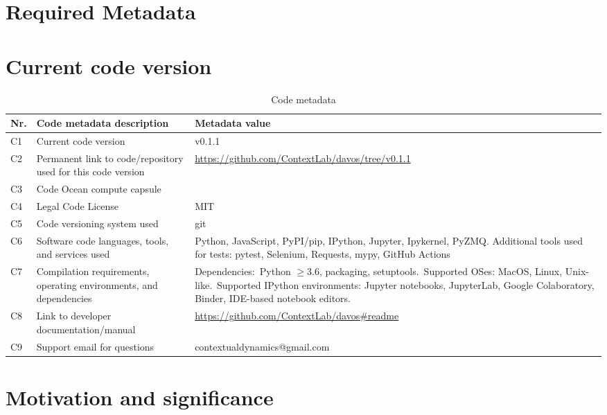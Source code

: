 \documentclass[preprint,12pt, a4paper]{elsarticle}
\begin{document}
\section*{Required Metadata}

\section*{Current code version}


\begin{table}[H]
\begin{tabular}{|l|p{6.5cm}|p{6.5cm}|}
\hline
\textbf{Nr.} & \textbf{Code metadata description} & \textbf{Metadata value} \\
\hline
C1 & Current code version &  v0.1.1 \\
\hline
C2 & Permanent link to code/repository used for this code version & \url{https://github.com/ContextLab/davos/tree/v0.1.1} \\
\hline
C3 & Code Ocean compute capsule & \\
\hline
C4 & Legal Code License & MIT \\
\hline
C5 & Code versioning system used & git \\
\hline
C6 & Software code languages, tools, and services used & Python, JavaScript, PyPI/pip, IPython, Jupyter, Ipykernel, PyZMQ. Additional tools used for tests: pytest, Selenium, Requests, mypy, GitHub Actions \\
\hline
C7 & Compilation requirements, operating environments, and
     dependencies & Dependencies:~Python $\geq 3.6$, packaging, setuptools.~Supported OSes: MacOS, Linux, Unix-like.~Supported IPython environments: Jupyter notebooks, JupyterLab, Google Colaboratory, Binder, IDE-based notebook editors. \\
\hline
C8 & Link to developer documentation/manual & \url{https://github.com/ContextLab/davos\#readme} \\
\hline
C9 & Support email for questions & contextualdynamics@gmail.com \\
\hline
\end{tabular}
\caption{Code metadata}
\label{}
\end{table}

\linenumbers


\section{Motivation and significance}
\end{document}
